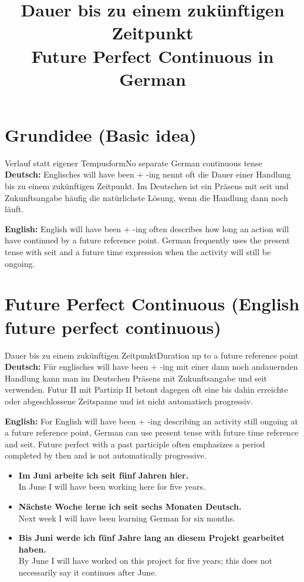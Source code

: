 \documentclass[a4paper,11pt]{article}
\title{Dauer bis zu einem zukünftigen Zeitpunkt\\\large\textnormal{Future Perfect Continuous in German}}
\date{}
\newcommand{\GermanText}[1]{\textbf{Deutsch: }#1\par}
\newcommand{\EnglishText}[1]{{\small\color{SoftGray}\textbf{English: }#1\par}}
\newcommand{\ExampleItem}[2]{\item \textbf{#1}\\{\small\color{SoftGray}#2}}
\begin{document}
    \maketitle
    \tableofcontents
    \newpage


\section{Grundidee \textnormal{(Basic idea)}}
\begin{grammarentry}{Verlauf statt eigener Tempusform}{No separate German continuous tense}
\GermanText{Englisches will have been + -ing nennt oft die Dauer einer Handlung bis zu einem zukünftigen Zeitpunkt. Im Deutschen ist ein Präsens mit seit und Zukunftsangabe häufig die natürlichste Lösung, wenn die Handlung dann noch läuft.}
\EnglishText{English will have been + -ing often describes how long an action will have continued by a future reference point. German frequently uses the present tense with seit and a future time expression when the activity will still be ongoing.}
\end{grammarentry}

\section{Future Perfect Continuous \textnormal{(English future perfect continuous)}}
\begin{grammarentry}{Dauer bis zu einem zukünftigen Zeitpunkt}{Duration up to a future reference point}
\GermanText{Für englisches will have been + -ing mit einer dann noch andauernden Handlung kann man im Deutschen Präsens mit Zukunftsangabe und seit verwenden. Futur II mit Partizip II betont dagegen oft eine bis dahin erreichte oder abgeschlossene Zeitspanne und ist nicht automatisch progressiv.}
\EnglishText{For English will have been + -ing describing an activity still ongoing at a future reference point, German can use present tense with future time reference and seit. Future perfect with a past participle often emphasizes a period completed by then and is not automatically progressive.}
\end{grammarentry}
\begin{exbox}
\begin{itemize}
\ExampleItem{Im Juni arbeite ich seit fünf Jahren hier.}{In June I will have been working here for five years.}
\ExampleItem{Nächste Woche lerne ich seit sechs Monaten Deutsch.}{Next week I will have been learning German for six months.}
\ExampleItem{Bis Juni werde ich fünf Jahre lang an diesem Projekt gearbeitet haben.}{By June I will have worked on this project for five years; this does not necessarily say it continues after June.}
\end{itemize}
\end{exbox}
\end{document}
